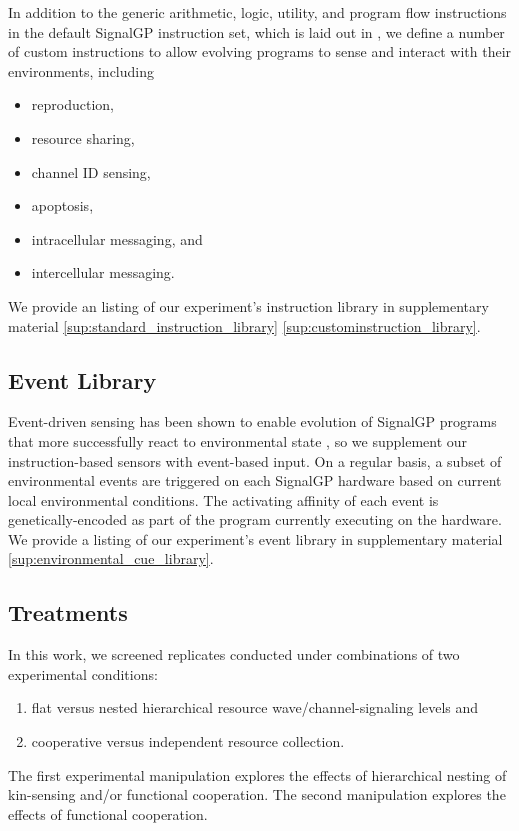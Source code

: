 In addition to the generic arithmetic, logic, utility, and program flow instructions in the default SignalGP instruction set, which is laid out in \cite{lalejini2018evolving}, we define a number of custom instructions to allow evolving programs to sense and interact with their environments, including
\begin{itemize}
\item reproduction,
\item resource sharing,
\item channel ID sensing,
\item apoptosis,
\item intracellular messaging, and
\item intercellular messaging.
\end{itemize}
We provide an listing of our experiment's instruction library in supplementary material \ref{sup:standard_instruction_library} \ref{sup:custominstruction_library}.

\subsection{Event Library}

Event-driven sensing has been shown to enable evolution of SignalGP programs that more successfully react to  environmental state \cite{lalejini2018evolving}, so we supplement our instruction-based sensors with event-based input.
On a regular basis, a subset of environmental events are triggered on each SignalGP hardware based on current local environmental conditions.
The activating affinity of each event is genetically-encoded as part of the program currently executing on the hardware.
We provide a listing of our experiment's event library in supplementary material \ref{sup:environmental_cue_library}.

\subsection{Treatments}

In this work, we screened replicates conducted under combinations of two experimental conditions:
\begin{enumerate}
\item flat versus nested hierarchical resource wave/channel-signaling levels and
\item cooperative versus independent resource collection.
\end{enumerate}

The first experimental manipulation explores the effects of hierarchical nesting of kin-sensing and/or functional cooperation.
The second manipulation explores the effects of functional cooperation.

